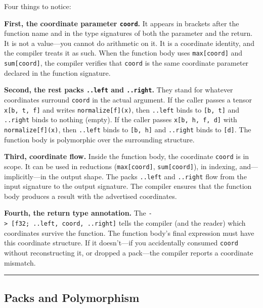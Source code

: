 \documentclass[11pt,]{article}
\begin{document}
Four things to notice:

\textbf{First, the coordinate parameter \texttt{coord}.} It appears in
brackets after the function name and in the type signatures of both the
parameter and the return. It is not a value---you cannot do arithmetic
on it. It is a coordinate identity, and the compiler treats it as such.
When the function body uses \texttt{max{[}coord{]}} and
\texttt{sum{[}coord{]}}, the compiler verifies that \texttt{coord} is
the same coordinate parameter declared in the function signature.

\textbf{Second, the rest packs \texttt{..left} and \texttt{..right}.}
They stand for whatever coordinates surround \texttt{coord} in the
actual argument. If the caller passes a tensor \texttt{x{[}b,\ t,\ f{]}}
and writes \texttt{normalize{[}f{]}(x)}, then \texttt{..left} binds to
\texttt{{[}b,\ t{]}} and \texttt{..right} binds to nothing (empty). If
the caller passes \texttt{x{[}b,\ h,\ f,\ d{]}} with
\texttt{normalize{[}f{]}(x)}, then \texttt{..left} binds to
\texttt{{[}b,\ h{]}} and \texttt{..right} binds to \texttt{{[}d{]}}. The
function body is polymorphic over the surrounding structure.

\textbf{Third, coordinate flow.} Inside the function body, the
coordinate \texttt{coord} is in scope. It can be used in reductions
(\texttt{max{[}coord{]}}, \texttt{sum{[}coord{]}}), in indexing,
and---implicitly---in the output shape. The packs \texttt{..left} and
\texttt{..right} flow from the input signature to the output signature.
The compiler ensures that the function body produces a result with the
advertised coordinates.

\textbf{Fourth, the return type annotation.} The
\texttt{-\textgreater{}\ {[}f32;\ ..left,\ coord,\ ..right{]}} tells the
compiler (and the reader) which coordinates survive the function. The
function body's final expression must have this coordinate structure. If
it doesn't---if you accidentally consumed \texttt{coord} without
reconstructing it, or dropped a pack---the compiler reports a coordinate
mismatch.

\begin{center}\rule{0.5\linewidth}{0.4pt}\end{center}

\hypertarget{packs-and-polymorphism}{%
\subsection{Packs and Polymorphism}\label{packs-and-polymorphism}}
\end{document}
